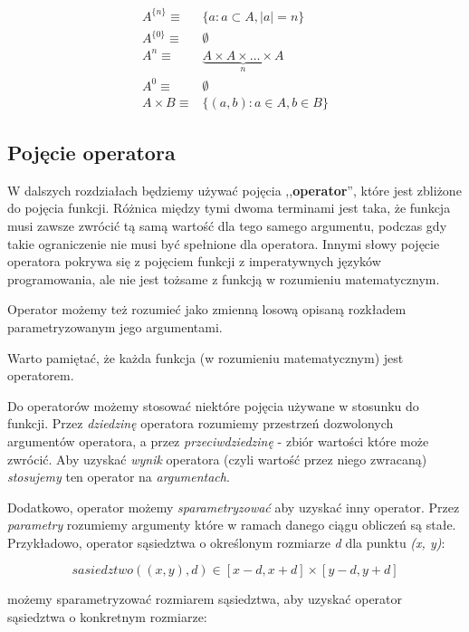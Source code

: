 \documentclass[twoside]{iisthesis}
\newcommand{\withSize}[2]{{#1}^{ \{ #2 \}}}
\begin{document}
\begin{align}
	\withSize{A}{n} \equiv &\{ a: a \subset A, |a|=n  \} \\
	\withSize{A}{0} \equiv &\emptyset \\
	A^n \equiv &\underbrace{A \times A \times \ldots \times A}_{n} \\
	A^0 \equiv &\emptyset \\
	A \times B \equiv &\{ (a, b): a \in A, b \in B \}
\end{align}

\subsection{Pojęcie operatora} \label{subsection:operator}

W dalszych rozdziałach będziemy używać pojęcia ,,\textbf{operator}'', które jest zbliżone do pojęcia funkcji. Różnica między tymi dwoma terminami jest taka, że funkcja musi zawsze zwrócić tą samą wartość dla tego samego argumentu, podczas gdy takie ograniczenie nie musi być spełnione dla operatora. Innymi słowy pojęcie operatora pokrywa się z pojęciem funkcji z imperatywnych języków programowania, ale nie jest tożsame z funkcją w rozumieniu matematycznym.

Operator możemy też rozumieć jako zmienną losową opisaną rozkładem parametryzowanym jego argumentami.

Warto pamiętać, że każda funkcja (w rozumieniu matematycznym) jest operatorem.

Do operatorów możemy stosować niektóre pojęcia używane w stosunku do funkcji. Przez \emph{dziedzinę} operatora rozumiemy przestrzeń dozwolonych argumentów operatora, a przez \emph{przeciwdziedzinę} - zbiór wartości które może zwrócić. Aby uzyskać \emph{wynik} operatora (czyli wartość przez niego zwracaną) \emph{stosujemy} ten operator na \emph{argumentach}.

Dodatkowo, operator możemy \emph{sparametryzować} aby uzyskać inny operator. Przez \emph{parametry} rozumiemy argumenty które w ramach danego ciągu obliczeń są stałe. Przykładowo, operator sąsiedztwa o określonym rozmiarze \emph{d} dla punktu \emph{(x, y)}:

\begin{displaymath}
	sasiedztwo((x, y), d) \in [x-d, x+d] \times [y-d, y+d]
\end{displaymath}

możemy sparametryzować rozmiarem sąsiedztwa, aby uzyskać operator sąsiedztwa o konkretnym rozmiarze:
\end{document}
